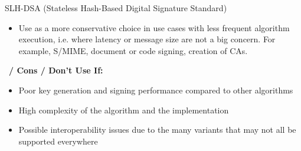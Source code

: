 \begin{algorithmbox}{SLH-DSA (Stateless Hash-Based Digital Signature Standard)}
\begin{minipage}[t]{0.49\textwidth}
\begin{itemize}[leftmargin=*]
            \item Use as a more conservative choice in use cases with less frequent algorithm execution, i.e. where latency or message size are not a big concern. For example, S/MIME, document or code signing, creation of CAs.
        \end{itemize}
    \end{minipage}
    \hfill
    \begin{minipage}[t]{0.49\textwidth}
        \scriptsize \faThumbsDown\, {\bfseries / Cons / Don't Use If:}
        \begin{itemize}[leftmargin=*]
            \setlength\itemsep{0em}
            \item Poor key generation and signing performance compared to other algorithms
            \item High complexity of the algorithm and the implementation
            \item Possible interoperability issues due to the many variants that may not all be supported everywhere
        \end{itemize}
    \end{minipage}
\end{algorithmbox}
